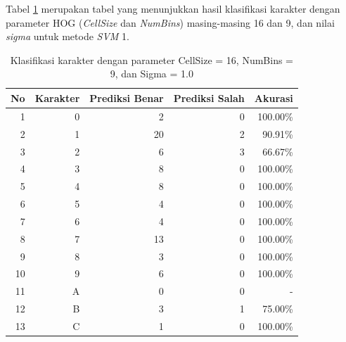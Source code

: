 \noindent Tabel \ref{tab:hasilklasifikasisel16} merupakan tabel yang menunjukkan hasil klasifikasi karakter dengan parameter HOG (\textit{CellSize} dan \textit{NumBins}) masing-masing 16 dan 9, dan nilai \textit{sigma} untuk metode \textit{SVM} 1.

\begin{longtable}[c]{|r|r|r|r|r|}
	\caption{Klasifikasi karakter dengan parameter CellSize = 16, NumBins = 9, dan Sigma = 1.0}
	\label{tab:hasilklasifikasisel16}\\
	\hline
	\textbf{No} & \textbf{Karakter} & \textbf{Prediksi Benar} & \textbf{Prediksi Salah} & \textbf{Akurasi} \\ \hline
	\endhead
	1           & 0                 & 2                       & 0                       &100.00\%            \\ \hline
	2           & 1                 & 20                       & 2                       &90.91\%            \\ \hline
	3           & 2                 & 6                       & 3                       &66.67\%            \\ \hline
	4           & 3                 & 8                       & 0                       &100.00\%            \\ \hline
	5           & 4                 & 8                       & 0                       &100.00\%            \\ \hline
	6           & 5                 & 4                       & 0                       &100.00\%            \\ \hline
	7           & 6                 & 4                       & 0                       &100.00\%            \\ \hline
	8           & 7                 & 13                       & 0                       &100.00\%            \\ \hline
	9           & 8                 & 3                       & 0                       &100.00\%            \\ \hline
	10           & 9                 & 6                       & 0                       &100.00\%            \\ \hline
	11           & A                 & 0                       & 0                       & -            \\ \hline
	12           & B                 & 3                       & 1                       &75.00\%            \\ \hline
	13           & C                 & 1                       & 0                       &100.00\%            \\ \hline

\end{longtable}
